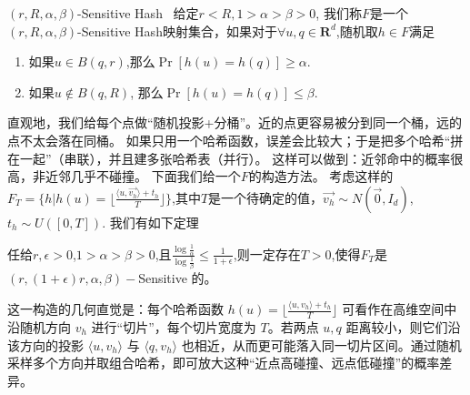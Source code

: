 \documentclass[lang=cn,newtx,10pt,scheme=chinese,chinesefont=nofont,citestyle=gb7714-2015, bibstyle=gb7714-2015]{elegantbook}
\begin{document}
\begin{refsection}
\begin{definition}{$(r,R,\alpha,\beta)$-Sensitive Hash~\cite{andoni2006near}}
给定$r<R,1>\alpha>\beta>0$, 我们称$F$是一个$(r,R,\alpha,\beta)$-Sensitive Hash映射集合，如果对于$\forall u,q\in\mathbf{R}^d$,随机取$h\in F$满足
\begin{enumerate}
    \item 如果$u\in B(q,r)$,那么$\Pr[h(u)=h(q)]\geq \alpha$.
    \item 如果$u\not\in B(q,R)$, 那么$\Pr[h(u)=h(q)]\leq \beta$.
\end{enumerate}
\end{definition}
直观地，我们给每个点做“随机投影+分桶”。近的点更容易被分到同一个桶，远的点不太会落在同桶。
如果只用一个哈希函数，误差会比较大；于是把多个哈希“拼在一起”（串联），并且建多张哈希表（并行）。
这样可以做到：近邻命中的概率很高，非近邻几乎不碰撞。
下面我们给一个$F$的构造方法。
考虑这样的$F_T=\{h|h(u)=\lfloor \frac{\langle u,\Vec{v_h} \rangle+t_h}{T} \rfloor\}$,其中$T$是一个待确定的值，$\Vec{v_h}\sim N(\Vec{0},I_d)$,$t_h\sim U([0,T])$.
我们有如下定理
\begin{theorem}
    任给$r,\epsilon>0$,$1>\alpha>\beta>0$,且$\frac{\log\frac{1}{\alpha}}{\log\frac{1}{\beta}}\leq \frac{1}{1+\epsilon}$,则一定存在$T>0$,使得$F_T$是$(r,(1+\epsilon)r,\alpha,\beta)-$Sensitive 的。
\end{theorem}
这一构造的几何直觉是：每个哈希函数 $h(u)=\lfloor \frac{\langle u, v_h \rangle + t_h}{T} \rfloor$ 可看作在高维空间中沿随机方向 $v_h$ 进行“切片”，每个切片宽度为 $T$。若两点 $u,q$ 距离较小，则它们沿该方向的投影 $\langle u,v_h\rangle$ 与 $\langle q,v_h\rangle$ 也相近，从而更可能落入同一切片区间。通过随机采样多个方向并取组合哈希，即可放大这种“近点高碰撞、远点低碰撞”的概率差异。


\end{refsection}
\end{document}
